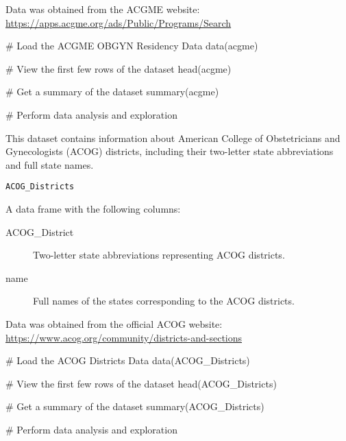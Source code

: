 \documentclass[a4paper]{book}
\begin{document}
%
\begin{Source}
Data was obtained from the ACGME website: \url{https://apps.acgme.org/ads/Public/Programs/Search}
\end{Source}
%
\begin{Examples}
\begin{ExampleCode}
# Load the ACGME OBGYN Residency Data
data(acgme)

# View the first few rows of the dataset
head(acgme)

# Get a summary of the dataset
summary(acgme)

# Perform data analysis and exploration

\end{ExampleCode}
\end{Examples}
%
\begin{Description}
This dataset contains information about American College of Obstetricians and Gynecologists (ACOG) districts, including their two-letter state abbreviations and full state names.
\end{Description}
%
\begin{Usage}
\begin{verbatim}
ACOG_Districts
\end{verbatim}
\end{Usage}
%
\begin{Format}
A data frame with the following columns:
\begin{description}

\item[ACOG\_District] Two-letter state abbreviations representing ACOG districts.
\item[name] Full names of the states corresponding to the ACOG districts.

\end{description}

\end{Format}
%
\begin{Source}
Data was obtained from the official ACOG website: \url{https://www.acog.org/community/districts-and-sections}
\end{Source}
%
\begin{Examples}
\begin{ExampleCode}
# Load the ACOG Districts Data
data(ACOG_Districts)

# View the first few rows of the dataset
head(ACOG_Districts)

# Get a summary of the dataset
summary(ACOG_Districts)

# Perform data analysis and exploration

\end{ExampleCode}
\end{Examples}
\end{document}
